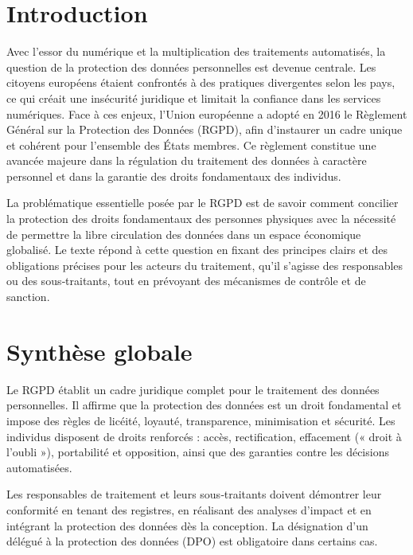 \documentclass[12pt,a4paper]{article}
\begin{document}
\tableofcontents
\newpage

\section*{Introduction}

Avec l'essor du numérique et la multiplication des traitements automatisés, la question de la protection des données personnelles est devenue centrale. Les citoyens européens étaient confrontés à des pratiques divergentes selon les pays, ce qui créait une insécurité juridique et limitait la confiance dans les services numériques. Face à ces enjeux, l'Union européenne a adopté en 2016 le Règlement Général sur la Protection des Données (RGPD), afin d'instaurer un cadre unique et cohérent pour l'ensemble des États membres. Ce règlement constitue une avancée majeure dans la régulation du traitement des données à caractère personnel et dans la garantie des droits fondamentaux des individus.

La problématique essentielle posée par le RGPD est de savoir comment concilier la protection des droits fondamentaux des personnes physiques avec la nécessité de permettre la libre circulation des données dans un espace économique globalisé. Le texte répond à cette question en fixant des principes clairs et des obligations précises pour les acteurs du traitement, qu'il s'agisse des responsables ou des sous‑traitants, tout en prévoyant des mécanismes de contrôle et de sanction.

\newpage

\section*{Synthèse globale}

Le RGPD établit un cadre juridique complet pour le traitement des données personnelles. Il affirme que la protection des données est un droit fondamental et impose des règles de licéité, loyauté, transparence, minimisation et sécurité. Les individus disposent de droits renforcés : accès, rectification, effacement (« droit à l'oubli »), portabilité et opposition, ainsi que des garanties contre les décisions automatisées.

Les responsables de traitement et leurs sous‑traitants doivent démontrer leur conformité en tenant des registres, en réalisant des analyses d'impact et en intégrant la protection des données dès la conception. La désignation d'un délégué à la protection des données (DPO) est obligatoire dans certains cas.
\end{document}

